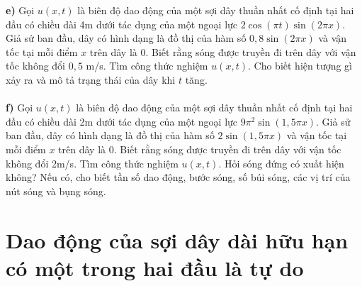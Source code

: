 \documentclass[10pt, a4paper]{article}
\begin{document}
	\textbf{e) }Gọi $u(x,t)$ là biên độ dao động của một sợi dây thuần nhất cố định tại hai đầu có chiều dài 4m dưới tác dụng của một ngoại lực $2\cos(\pi t)\sin(2\pi x)$. Giả sử ban đầu, dây có hình dạng là đồ thị của hàm số $0,8\sin(2\pi x)$ và vận tốc tại mỗi điểm $x$ trên dây là 0. Biết rằng sóng được truyền đi trên dây với vận tốc không đổi $0,5$ m/s. Tìm công thức nghiệm $u(x,t)$. Cho biết hiện tượng gì xảy ra và mô tả trạng thái của dây khi $t$ tăng.\\\\
	\textbf{f) }Gọi $u(x,t)$ là biên độ dao động của một sợi dây thuần nhất cố định tại hai đầu có chiều dài 2m dưới tác dụng của một ngoại lực $9\pi^2\sin(1,5\pi x)$. Giả sử ban đầu, dây có hình dạng là đồ thị của hàm số $2\sin(1,5\pi x)$ và vận tốc tại mỗi điểm $x$ trên dây là 0. Biết rằng sóng được truyền đi trên dây với vận tốc không đổi 2m/s. Tìm công thức nghiệm $u(x,t)$. Hỏi sóng đứng có xuất hiện không? Nếu có, cho biết tần số dao động, bước sóng, số búi sóng, các vị trí của nút sóng và bụng sóng.
	\newpage
	\section{Dao động của sợi dây dài hữu hạn có một trong hai đầu là tự do}
\end{document}
